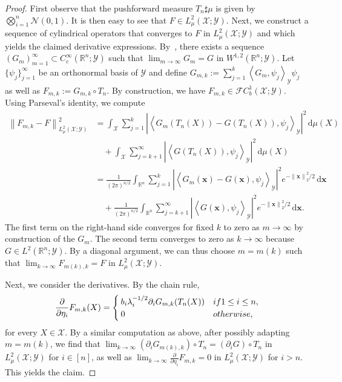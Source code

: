 \documentclass[namedate,webpdf]{ima-authoring-template-blank}
\def\D{\,\mathrm{d}}
\newcommand*{\nm}[1]{{\left\|#1\right \|}}
\newcommand{\abs}[1]{\left|#1\right|}
\newcommand*{\ip}[2]{\left\langle #1, #2 \right\rangle}
\numberwithin{counter}{section}
\numberwithin{equation}{section}
\theoremstyle{plain}
\theoremstyle{definition}
\newcommand*{\cF}{\mathcal{F}}
\newcommand*{\cN}{\mathcal{N}}
\newcommand*{\cX}{\mathcal{X}}
\newcommand*{\cY}{\mathcal{Y}}
\newcommand*{\bbR}{\mathbb{R}}
\theoremstyle{thmstyletwo}
\begin{document}
\begin{proof}
    First observe that the pushforward measure \( T_n \sharp \mu \) is given by  \( \bigotimes_{i = 1}^n \cN(0,1) \). It is then easy to see that \( F \in L^2_{\mu}(\cX; \cY) \). Next, we construct a sequence of cylindrical operators that converges to \( F \) in \( L^2_{\mu}(\cX; \cY) \) and which yields the claimed derivative expressions. By~\citet[Cor. 2.5.6]{hytonen_AnalysisBanachSpacesVolume_2016}, there exists a sequence \( (G_m)_{m = 1}^{\infty} \subset C_c^{\infty}(\bbR^n; \cY) \) such that \( \lim_{m \to \infty} G_m = G \) in \( W^{1,2}(\bbR^n; \cY) \). Let \( \{\psi_j\}_{j = 1}^{\infty} \) be an orthonormal basis of \( \cY \) and define \( G_{m,k} := \sum_{j = 1}^k \ip{G_m}{\psi_j}_{\cY} \psi_j \) as well as \( F_{m,k} := G_{m,k} \circ T_n \). By construction, we have \( F_{m,k} \in \cF C_b^1(\cX; \cY) \). Using Parseval's identity, we compute
    \begin{align*}
        \nm{F_{m,k} - F}_{L^2_{\mu}(\cX; \cY)}^2 
        &= \int_{\cX} \sum_{j = 1}^k \abs{\ip{G_m(T_n(X)) - G(T_n(X))}{\psi_j}_{\cY}}^2 \D \mu(X) \\ 
        & \quad + \int_{\cX} \sum_{j = k + 1}^{\infty} \abs{\ip{G(T_n(X))}{\psi_j}_{\cY}}^2 \D \mu(X) \\
        &= \frac{1}{(2 \pi)^{n / 2}} \int_{\bbR^n} \sum_{j = 1}^k \abs{\ip{G_m(\bm{x}) - G(\bm{x})}{\psi_j}_{\cY}}^2 e^{-\nm{\bm{x}}_2^2 / 2} \D \bm{x} \\
        & \quad + \frac{1}{(2 \pi)^{n / 2}} \int_{\bbR^n} \sum_{j = k + 1}^{\infty} \abs{\ip{G(\bm{x})}{\psi_j}_{\cY}}^2 e^{-\nm{\bm{x}}_2^2 / 2} \D \bm{x}.
    \end{align*}
    The first term on the right-hand side converges for fixed \( k \) to zero as \( m \to \infty \) by construction of the \( G_m \). The second term converges to zero as \( k \to \infty \) because \( G \in L^2(\bbR^n; \cY) \). By a diagonal argument, we can thus choose \( m = m(k) \) such that \( \lim_{k \to \infty} F_{m(k), k} = F \) in \( L^2_{\mu}(\cX; \cY) \).
    
    Next, we consider the derivatives. By the chain rule,
    \[
    \frac{\partial}{\partial \eta_i} F_{m,k}(X) = 
    \begin{cases}
        b_i \lambda_i^{-1/2} \partial_i G_{m,k}(T_n(X)) & \textup{ if } 1 \leq i \leq n, \\
        0 & \textup{ otherwise,}
    \end{cases}
    \]
    for every \( X \in \cX \). By a similar computation as above, after possibly adapting \( m = m(k) \), we find that \( \lim_{k \to \infty} (\partial_i G_{m(k),k}) \circ T_n = (\partial_i G) \circ T_n \) in \( L^2_{\mu}(\cX; \cY) \) for \( i \in [n] \), as well as \(  \lim_{k \to \infty} \frac{\partial}{\partial \eta_i} F_{m,k} = 0 \) in \( L^2_{\mu}(\cX; \cY) \) for \( i > n \). This yields the claim. 
\end{proof}
\end{document}
